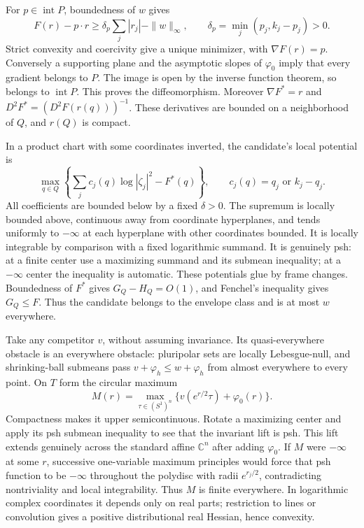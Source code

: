 \documentclass[11pt]{article}
\newcommand{\C}{\mathbb C}
\begin{document}
For $p\in\operatorname{int}P$, boundedness of $w$ gives
\begin{equation}\label{eq:coercive}
 F(r)-p\cdot r\geq\delta_p\sum_j|r_j|-\|w\|_\infty,
 \qquad\delta_p=\min_j(p_j,k_j-p_j)>0.
\end{equation}
Strict convexity and coercivity give a unique minimizer, with
$\nabla F(r)=p$. Conversely a supporting plane and the asymptotic
slopes of $\varphi_0$ imply that every gradient belongs to $P$.
The image is open by the inverse function theorem, so belongs to
$\operatorname{int}P$. This proves the diffeomorphism.
Moreover $\nabla F^*=r$ and $D^2F^*=(D^2F(r(q)))^{-1}$.
These derivatives are bounded on a neighborhood of $Q$, and $r(Q)$
is compact.

In a product chart with some coordinates inverted, the candidate's
local potential is
\begin{equation}\label{eq:charts}
 \max_{q\in Q}\left\{\sum_j c_j(q)\log|\zeta_j|^2-F^*(q)\right\},
 \qquad c_j(q)=q_j\text{ or }k_j-q_j.
\end{equation}
All coefficients are bounded below by a fixed $\delta>0$. The supremum
is locally bounded above, continuous away from coordinate hyperplanes,
and tends uniformly to $-\infty$ at each hyperplane with other
coordinates bounded. It is locally integrable by comparison with a
fixed logarithmic summand. It is genuinely psh: at a finite center use
a maximizing summand and its submean inequality; at a $-\infty$ center
the inequality is automatic. These potentials glue by frame changes.
Boundedness of $F^*$ gives $G_Q-H_Q=O(1)$, and Fenchel's inequality
gives $G_Q\leq F$. Thus the candidate belongs to the envelope class and
is at most $w$ everywhere.

Take any competitor $v$, without assuming invariance. Its
quasi-everywhere obstacle is an everywhere obstacle: pluripolar sets
are locally Lebesgue-null, and shrinking-ball submeans pass
$v+\varphi_h\leq w+\varphi_h$ from almost everywhere to every point.
On $T$ form the circular maximum
\[
 M(r)=\max_{\tau\in(S^1)^n}\{v(e^{r/2}\tau)+\varphi_0(r)\}.
\]
Compactness makes it upper semicontinuous. Rotate a maximizing center
and apply its psh submean inequality to see that the invariant lift is
psh. This lift extends genuinely across the standard affine $\C^n$
after adding $\varphi_0$. If $M$ were $-\infty$ at some $r$,
successive one-variable maximum principles would force that psh
function to be $-\infty$ throughout the polydisc with radii $e^{r_j/2}$,
contradicting nontriviality and local integrability. Thus $M$ is finite
everywhere. In logarithmic complex coordinates it depends only on real
parts; restriction to lines or convolution gives a positive
distributional real Hessian, hence convexity.
\end{document}
